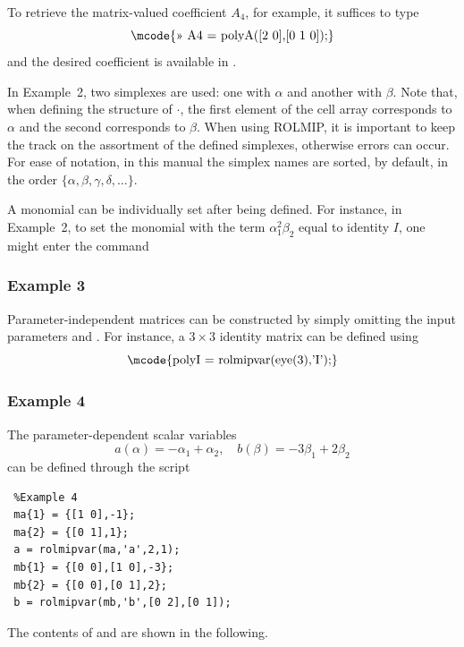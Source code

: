 \documentclass[english,11pt]{article}
\newcommand\vi{\vspace{.5cm}}
\theoremstyle{break} \theorembodyfont{\small\rm}
\begin{document}
\vi

To retrieve the matrix-valued coefficient $A_4$, for example, it suffices to type
\[
\mbox{\mcode{>> A4 = polyA([2 0],[0 1 0]);}}
\]
and the desired coefficient is available in .



In Example~2, two simplexes are used: one with $\alpha$ and another with $\beta$. Note that,
when defining the structure of $\cdot$\mcode{\}}, the first element of the cell array
corresponds to $\alpha$ and the second corresponds to $\beta$. When using ROLMIP, it is important 
to keep the track on the assortment of the defined simplexes, otherwise errors can occur.
For ease of notation, in this manual the simplex names are sorted, by default, in the order
$\{\alpha, \beta, \gamma, \delta, \ldots\}$.


A monomial can be individually set after being defined. For instance, in Example~2, 
to set the monomial with the term $\alpha_1^2\beta_2$ equal to identity $I$, 
one might enter the command


\subsubsection*{Example 3}
Parameter-independent matrices can be constructed by simply omitting the input parameters 
and . For instance, a $3 \times 3$ identity matrix can be defined using
\[
\mbox{\mcode{polyI = rolmipvar(eye(3),'I');}}
\]


\subsubsection*{Example 4}
The parameter-dependent scalar variables
\[
 a(\alpha) = -\alpha_1 + \alpha_2, \quad b(\beta) = -3\beta_1 + 2\beta_2
\]
can be defined through the script

\begin{minipage}{9.5cm}
\begin{lstlisting}
 %Example 4
 ma{1} = {[1 0],-1};
 ma{2} = {[0 1],1};
 a = rolmipvar(ma,'a',2,1);
 mb{1} = {[0 0],[1 0],-3};
 mb{2} = {[0 0],[0 1],2};
 b = rolmipvar(mb,'b',[0 2],[0 1]);
\end{lstlisting}
\end{minipage}

The contents of  and  are shown in the following.
\end{document}
